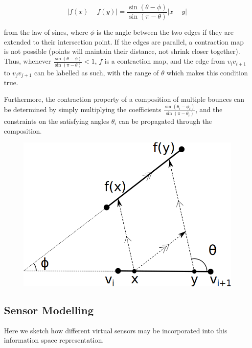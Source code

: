 \documentclass[]{article}  %
\begin{document}
\begin{equation*}
|f(x) - f(y)| = \frac{\sin(\theta - \phi)}{\sin(\pi-\theta)} |x-y|
\end{equation*}

from the law of sines, where $\phi$ is the angle between the two edges if they
are extended to their intersection point. If the edges are parallel, a
contraction map is not possible (points will maintain their distance, not shrink
closer together). Thus, whenever $\frac{\sin(\theta - \phi)}{\sin(\pi-\theta)}
< 1$, $f$ is a contraction map, and the edge from $v_i v_{i+1}$ to $v_j
v_{j+1}$ can be labelled as such, with the range of $\theta$ which makes this
condition true.

Furthermore, the contraction property of a composition of multiple bounces can
be determined by simply multiplying the coefficients $\frac{\sin(\theta_i -
\phi_i)}{\sin(\pi-\theta_i)}$, and the constraints on the satisfying angles
$\theta_i$ can be propagated through the composition.

\begin{figure}
    \includegraphics[width=0.8\linewidth]{figures/contraction_map_cond.png}
    \centering
    \caption{\label{fig:cont_map}}
    \centering
\end{figure}

\subsection{Sensor Modelling}

Here we sketch how different virtual sensors may be incorporated into this
information space representation.
\end{document}
